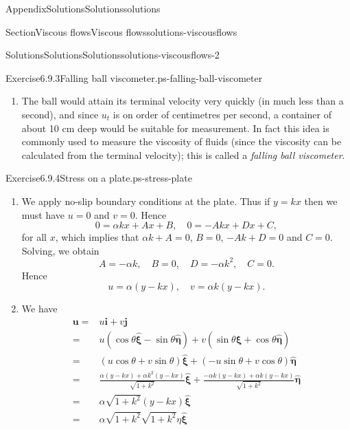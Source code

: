 \documentclass[oneside,10pt,]{book}
\numberwithin{equation}{section}
\newcommand{\bu}{\boldsymbol{u}}
\begin{document}
\begin{appendixptx}{Appendix}{Solutions}{}{Solutions}{}{}{solutions}
\begin{sectionptx}{Section}{Viscous flows}{}{Viscous flows}{}{}{solutions-viscousflows}
\begin{solutions-subsection-numberless}{Solutions}{Solutions}{}{Solutions}{}{}{solutions-viscousflows-2}
\begin{divisionsolution}{Exercise}{6.9.3}{Falling ball viscometer.}{ps-falling-ball-viscometer}
\begin{enumerate}[font=\bfseries,label=(\alph*),ref=\alph*]
\item[(g)]\noindent\hypertarget{ps-falling-ball-viscometer-9-2-main}{}The ball would attain its terminal velocity very quickly (in much less than a second), and since \(u_t\) is on order of centimetres per second, a container of about 10 cm deep would be suitable for measurement. In fact this idea is commonly used to measure the viscosity of fluids (since the viscosity can be calculated from the terminal velocity); this is called a \emph{falling ball viscometer}.%
\end{enumerate}%
\end{divisionsolution}%
\begin{divisionsolution}{Exercise}{6.9.4}{Stress on a plate.}{ps-stress-plate}%
\begin{enumerate}[font=\bfseries,label=(\alph*),ref=\alph*]%
\item[(a)]\noindent\hypertarget{ps-stress-plate-3-2-main}{}We apply no-slip boundary conditions at the plate. Thus if \(y=kx\) then we must have \(u=0\) and \(v=0\). Hence%
\begin{equation*}
0=\alpha kx+Ax+B,\quad 0=-Akx+Dx+C,
\end{equation*}
for all \(x\), which implies that \(\alpha k+A=0\), \(B=0\), \(-Ak+D=0\) and \(C=0\). Solving, we obtain%
\begin{equation*}
A=-\alpha k,\quad
B=0,\quad
D=-\alpha k^2,\quad
C=0.  
\end{equation*}
Hence%
\begin{equation*}
u=\alpha\left(y-kx\right),\quad v=\alpha k\left(y-kx\right).
\end{equation*}
%
\item[(b)]\noindent\hypertarget{ps-stress-plate-4-3-main}{}We have%
\begin{align*}
\bu=&u\boldsymbol{i}+v\boldsymbol{j}\\
=&u\left(\cos\theta\hat{\boldsymbol{\xi}}-\sin\theta\hat{\boldsymbol{\eta}}\right)
+v\left(\sin\theta\hat{\boldsymbol{\xi}}+\cos\theta\hat{\boldsymbol{\eta}}\right)\\
=&\left(u\cos\theta+v\sin\theta\right)\hat{\boldsymbol{\xi}}
+\left(-u\sin\theta+v\cos\theta\right)\hat{\boldsymbol{\eta}}\\
=&\frac{\alpha(y-kx)+\alpha k^2(y-kx)}{\sqrt{1+k^2}}\hat{\boldsymbol{\xi}}
+\frac{-\alpha k(y-kx)+\alpha k(y-kx)}{\sqrt{1+k^2}}\hat{\boldsymbol{\eta}}\\
=&\alpha\sqrt{1+k^2}(y-kx)\hat{\boldsymbol{\xi}}\\
=&\alpha\sqrt{1+k^2}\sqrt{1+k^2}\eta\hat{\boldsymbol{\xi}}\\

\end{align*}
\end{enumerate}
\end{divisionsolution}
\end{solutions-subsection-numberless}
\end{sectionptx}
\end{appendixptx}
\end{document}

